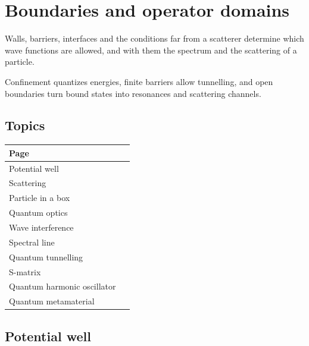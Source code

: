 \documentclass[11pt,oneside]{book}
\begin{document}
\chapter{Boundaries and operator domains}

\begin{claimbox}

Walls, barriers, interfaces and the conditions far from a scatterer determine which wave functions are allowed, and with them the spectrum and the scattering of a particle.

\end{claimbox}

Confinement quantizes energies, finite barriers allow tunnelling, and open boundaries turn bound states into resonances and scattering channels.

\section*{Topics}

\begin{longtable}{p{0.92\linewidth}}
\toprule
Page \\
\midrule
\endhead
{}\label{page:potential-well}Potential well \\
\label{page:scattering}Scattering \\
\label{page:particle-in-a-box}Particle in a box \\
\label{page:quantum-optics}Quantum optics \\
\label{page:wave-interference}Wave interference \\
\label{page:spectral-line}Spectral line \\
\label{page:quantum-tunnelling}Quantum tunnelling \\
\label{page:s-matrix}S-matrix \\
\label{page:quantum-harmonic-oscillator}Quantum harmonic oscillator \\
\label{page:quantum-metamaterial}Quantum metamaterial \\
\bottomrule
\end{longtable}

\clearpage

\section{Potential well}
\end{document}
